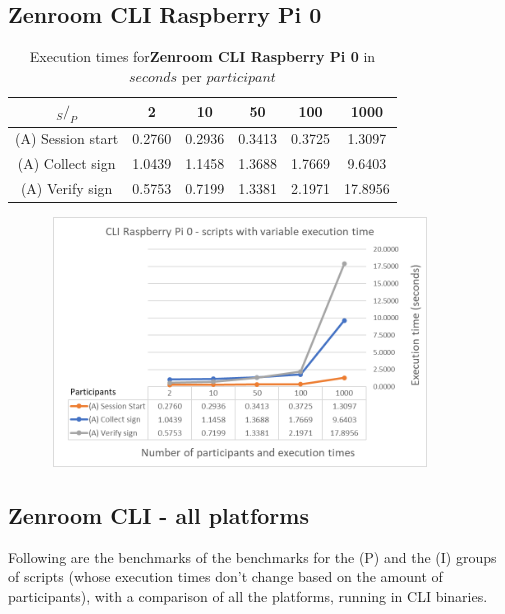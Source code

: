 \documentclass[twocolumn]{article}
\begin{document}
\pagebreak
\newpage

\subsection*{Zenroom CLI Raspberry Pi 0}

\begin{table}[h!]
  \begin{center}
    \caption{Execution times for\textbf{Zenroom CLI Raspberry Pi 0} in $seconds$ per $participant$}
      \label{tab:table1}
        \begin{tabular} {c|c|c|c|c|c}
          \toprule
           \textbf{$_S / _P$} & \textbf{2} & \textbf{10} & \textbf{50} & \textbf{100} & \textbf{1000} \\
          \midrule
          (A) Session start & 0.2760 & 0.2936 & 0.3413 & 0.3725 & 1.3097 \\
          (A) Collect sign & 1.0439 & 1.1458 & 1.3688 & 1.7669 & 9.6403 \\
          (A) Verify sign & 0.5753 & 0.7199 & 1.3381 & 2.1971 & 17.8956 \\
      \bottomrule %
    \end{tabular}
  \end{center}
\end{table}

\begin{figure}[h!]
    \centering
    \includegraphics[width=4in, height=2.6in]{graphs/CLIRaspi0.png}
    \label{fig:galaxy}
\end{figure}


\subsection*{Zenroom CLI - all platforms}

Following are the benchmarks of the benchmarks for the (P) and the (I) groups of scripts (whose execution times don't change based on the amount of participants), with a comparison of all the platforms, running in CLI binaries.
\end{document}

